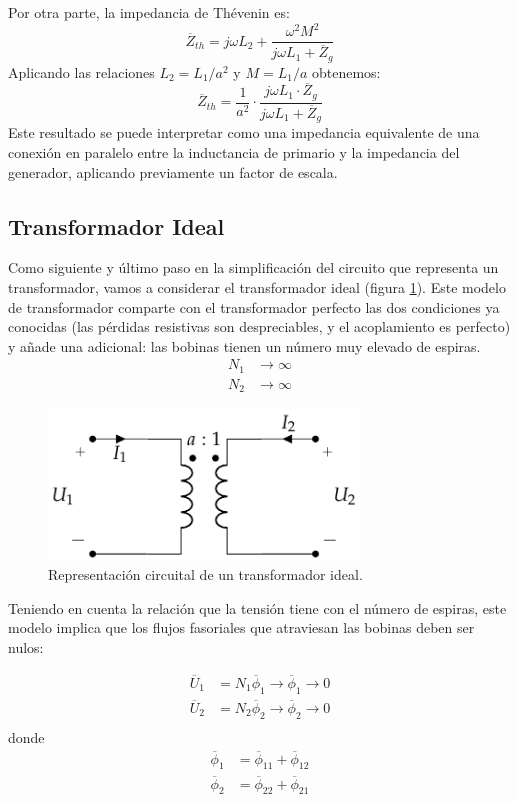 Por otra parte, la impedancia de Thévenin es:
\[
  \overline{Z}_{th} = j\omega L_2 + \frac{\omega^2 M^2}{j\omega L_1 +
    \overline{Z}_g}
\]
Aplicando las relaciones $L_2 = L_1/a^2$ y $M = L_1/a$ obtenemos:
\begin{equation}
  \label{eq:trafo-perfecto-impedancia-thevenin}
  \overline{Z}_{th} = \frac{1}{a^2} \cdot \frac{j \omega L_1 \cdot \overline{Z}_g}{j\omega L_1 + \overline{Z}_g}
\end{equation}
Este resultado se puede interpretar como una impedancia equivalente de
una conexión en paralelo entre la inductancia de primario y la
impedancia del generador, aplicando previamente un factor de escala.


\subsection{Transformador Ideal}
\label{sec:trafo-ideal}

Como siguiente y último paso en la simplificación del circuito que
representa un transformador, vamos a considerar el transformador ideal
(figura \ref{fig:trafo-ideal}). Este modelo de transformador comparte
con el transformador perfecto las dos condiciones ya conocidas (las
pérdidas resistivas son despreciables, y el acoplamiento es perfecto)
y añade una adicional: las bobinas tienen un número muy elevado de
espiras.
  \begin{align*}
  N_1 &\to \infty\\
  N_2 &\to \infty
  \end{align*}

  \begin{figure}
    \centering
    \includegraphics[height=4cm]{../figs/Trafo_Ideal.pdf}
    \caption{Representación circuital de un transformador ideal.}
    \label{fig:trafo-ideal}
  \end{figure}

  Teniendo en cuenta la relación que la tensión tiene con el número de espiras, este modelo implica que los flujos fasoriales que atraviesan las bobinas deben ser nulos:

  \begin{align*}
  \overline{U}_1 &= N_1 \overline{\phi}_1 \rightarrow \overline{\phi}_1 \to 0\\
  \overline{U}_2 &= N_2 \overline{\phi}_2 \rightarrow \overline{\phi}_2 \to 0\\
\end{align*}
donde
\begin{align*}
  \overline{\phi}_1 &= \overline{\phi}_{11} + \overline{\phi}_{12}\\
  \overline{\phi}_2 &= \overline{\phi}_{22} + \overline{\phi}_{21}
\end{align*}

